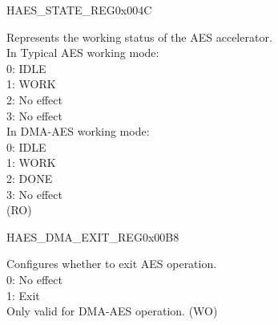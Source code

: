 \begin{register}{H}{AES\_STATE\_REG}{0x004C}\label{regdesc:AESSTATEREG}
%
%
\regnewline%
\begin{regdesc}\begin{reglist}
\item [AES\_STATE] Represents the working status of the AES accelerator. \\
In Typical AES working mode:\\
0: IDLE\\
1: WORK\\
2: No effect\\
3: No effect\\
In DMA-AES working mode:\\
0: IDLE\\
1: WORK\\
2: DONE\\
3: No effect\\
(RO) 
\end{reglist}\end{regdesc}
\end{register}


\begin{register}{H}{AES\_DMA\_EXIT\_REG}{0x00B8}\label{regdesc:AESDMAEXITREG}
%
%
\regnewline%
\begin{regdesc}\begin{reglist}
\item [AES\_DMA\_EXIT] Configures whether to exit AES operation. \\
0: No effect\\
1: Exit\\
Only valid for DMA-AES operation. (WO)
\end{reglist}\end{regdesc}
\end{register}


